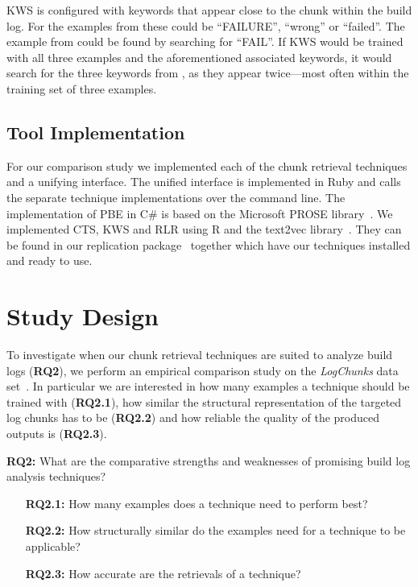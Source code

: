 KWS is configured with keywords that appear close to the chunk within
the build log.
For the examples from  these could be
``FAILURE'', ``wrong'' or ``failed''.
The example from  could be found
by searching for ``FAIL''.
If KWS would be trained with all three examples and the aforementioned
associated keywords, it would search for the three keywords from
, as they appear twice---most often within
the training set of three examples.

\subsection{Tool Implementation}
For our comparison study we implemented each of the chunk retrieval
techniques and a unifying interface.
The unified interface is implemented in Ruby and
calls the separate technique implementations over the command line.
The implementation of PBE in C\# is based on the Microsoft PROSE
library~\cite{prose2019webpage}.
We implemented CTS, KWS and RLR using
R and the text2vec library~\cite{text2vec2019webpage}.
They can be found in our replication
package~\cite{brandt2020chunk-replication} together which have
our techniques installed and ready to use.

\section{Study Design}
\label{sec:study}

To investigate when our chunk retrieval techniques are suited to
analyze build logs (\textbf{RQ2}), we perform an empirical comparison
study on the \emph{LogChunks} data set~\cite{brandt2020logchunks}.
In particular we are interested in how many examples a technique
should be trained with (\textbf{RQ2.1}),
how similar the structural representation of the targeted log chunks
has to be (\textbf{RQ2.2}) and how reliable the quality of the
produced outputs is (\textbf{RQ2.3}).

\begin{simplebox}[minipage boxed title*=-1.5cm,
attach boxed title to top center={yshift=-6mm}]
{\textbf{RQ2:} What are the comparative strengths and weaknesses
of promising build log analysis techniques?}
\begin{itemize}[leftmargin=1.2cm]
  \item[\textbf{RQ2.1:}] How many examples does a technique need to
  perform best?
  \item[\textbf{RQ2.2:}] How structurally similar do the examples
  need for a technique to be applicable?
  \item[\textbf{RQ2.3:}] How accurate are the retrievals of a technique?
\end{itemize}
\end{simplebox}

